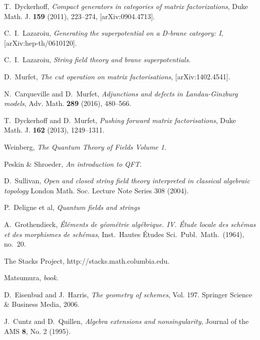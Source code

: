 \documentclass[english,letter paper,12pt,leqno]{article}
\theoremstyle{example}
\numberwithin{equation}{section}
\begin{document}

\providecommand{\bysame}{\leavevmode\hbox to3em{\hrulefill}\thinspace}
\providecommand{\href}[2]{#2}
\begin{thebibliography}{BHLS03}
  
T.~Dyckerhoff, \textsl{Compact generators in categories of matrix factorizations},
  Duke Math. J. \textbf{159} (2011), 223--274,
  \href{http://arxiv.org/abs/0904.4713}{[arXiv:0904.4713]}.
  
C.~I.~Lazaroiu, \textsl{Generating the superpotential on a D-brane category: I}, [arXiv:hep-th/0610120].

C.~I.~Lazaroiu, \textsl{String field theory and brane superpotentials}.
  
D.~Murfet, \textsl{The cut operation on matrix factorisations}, \href{http://arxiv.org/abs/1402.4541}{[arXiv:1402.4541]}.

N.~Carqueville and D.~Murfet, \textsl{Adjunctions and defects in Landau-Ginzburg models}, Adv. Math. \textbf{289} (2016), 480--566.

T.~Dyckerhoff and D.~Murfet, \textsl{Pushing forward matrix factorisations}, Duke Math. J. \textbf{162} (2013), 1249--1311.

Weinberg, \textsl{The Quantum Theory of Fields Volume 1}.

Peskin \& Shroeder, \textsl{An introduction to QFT}.

D.~Sullivan, \textsl{Open and closed string field theory interpreted in classical algebraic topology} London Math. Soc. Lecture Note Series 308 (2004).

P.~Deligne et al, \textsl{Quantum fields and strings}

A.~Grothendieck, \textsl{\'{E}l\'ements de g\'eom\'etrie alg\'ebrique. {IV}. \'{E}tude
  locale des sch\'emas et des morphismes de sch\'emas}, Inst.~Hautes \'Etudes
  Sci.~Publ.~Math.~(1964), no.~20.

The Stacks Project, \href{http://stacks.math.columbia.edu/}{http://stacks.math.columbia.edu}.

Matsumura, \emph{book}.

D.~Eisenbud and J.~Harris, \textsl{The geometry of schemes}, Vol. 197. Springer Science \& Business Media, 2006.

J.~Cuntz and D.~Quillen, \textsl{Algebra extensions and nonsingularity}, Journal of the AMS \textbf{8}, No. 2 (1995).


\end{thebibliography}
\end{document}
